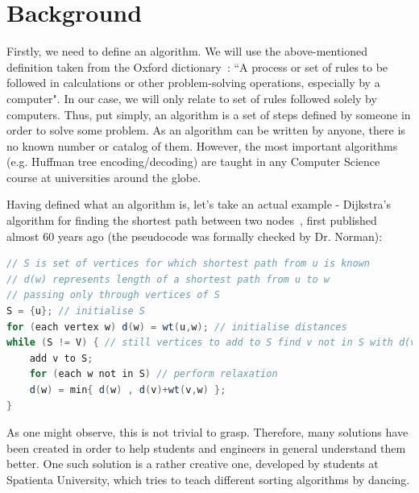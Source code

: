 \documentclass{l4proj}
\begin{document}

\chapter{Background}
\label{background}

Firstly, we need to define an algorithm. We will use the above-mentioned definition taken from the Oxford
dictionary~\cite{oxford-dict}: ``A process or set of rules to be followed in calculations or other problem-solving operations, especially by a computer". In our case, we will only relate to set of rules followed solely by computers. Thus, put simply, an algorithm is a set of steps defined by someone in order to solve some problem. As an algorithm can be written by anyone, there is no known number or catalog of them. However, the most important algorithms (e.g. Huffman tree encoding/decoding) are taught in any Computer Science course at universities around the globe.

Having defined what an algorithm is, let's take an actual example - Dijkstra's algorithm for finding the shortest path between two nodes~\cite{dijkstra-shortest-path}, first published almost 60 years ago (the pseudocode was formally checked by Dr. Norman):

\begin{lstlisting}[language=Java, caption=Pseudocode for Dijkstra's shortest path algorithm]
// S is set of vertices for which shortest path from u is known
// d(w) represents length of a shortest path from u to w
// passing only through vertices of S
S = {u}; // initialise S
for (each vertex w) d(w) = wt(u,w); // initialise distances
while (S != V) { // still vertices to add to S find v not in S with d(v) minimum;
	add v to S;
	for (each w not in S) // perform relaxation
	d(w) = min{ d(w) , d(v)+wt(v,w) };
}
\end{lstlisting}

As one might observe, this is not trivial to grasp. Therefore, many solutions have been created in order to help students and engineers in general understand them better. One such solution is a rather creative one, developed by students at Spatienta University, which tries to teach different sorting algorithms by dancing.

\pagebreak
\end{document}
